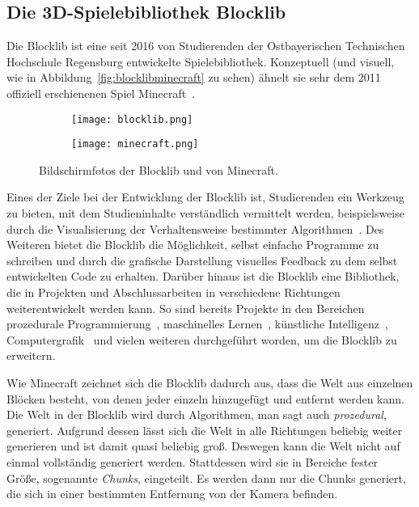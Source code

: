 \subsection{Die 3D-Spielebibliothek Blocklib}
Die Blocklib ist eine seit 2016 von Studierenden der Ostbayerischen Technischen Hochschule Regensburg entwickelte Spielebibliothek. Konzeptuell (und visuell, wie in Abbildung~\vref{fig:blocklibminecraft} zu sehen) ähnelt sie sehr dem 2011 offiziell erschienenen Spiel Minecraft~\cite{Mojang}.
\begin{figure}[!htbp]
	\begin{subfigure}[b]{.49\textwidth}
		\texttt{[image: blocklib.png]}
	\end{subfigure}
	\begin{subfigure}[b]{.49\textwidth}
		\texttt{[image: minecraft.png]}
	\end{subfigure}
	\caption{Bildschirmfotos der Blocklib und von Minecraft.}\label{fig:blocklibminecraft}
\end{figure}
Eines der Ziele bei der Entwicklung der Blocklib ist, Studierenden ein Werkzeug zu bieten, mit dem Studieninhalte verständlich vermittelt werden,  beispielsweise durch die Visualisierung der Verhaltensweise bestimmter Algorithmen~\cite{Helgert2018}. Des Weiteren bietet die Blocklib die Möglichkeit, selbst einfache Programme zu schreiben und durch die grafische Darstellung visuelles Feedback zu dem selbst entwickelten Code zu erhalten. Darüber hinaus ist die Blocklib eine Bibliothek, die in Projekten und Abschlussarbeiten in verschiedene Richtungen weiterentwickelt werden kann. So sind bereits Projekte in den Bereichen prozedurale Programmierung~\cite{Beer2017,Ebbinger2018a,Kalle2018,Sellner2020,Kohler2021}, maschinelles Lernen~\cite{Mayer2021}, künstliche Intelligenz~\cite{Amthor2017,Weidner2018,Bunke2021,Mayer2021}, Computergrafik~\cite{Zink2016,Ebbinger2018,Werner2018} und vielen weiteren durchgeführt worden, um die Blocklib zu erweitern.

Wie Minecraft zeichnet sich die Blocklib dadurch aus, dass die Welt aus einzelnen Blöcken besteht, von denen jeder einzeln hinzugefügt und entfernt werden kann. Die Welt in der Blocklib wird durch Algorithmen, man sagt auch \emph{prozedural}, generiert. Aufgrund dessen lässt sich die Welt in alle Richtungen beliebig weiter generieren und ist damit quasi beliebig groß. Deswegen kann die Welt nicht auf einmal vollständig generiert werden. Stattdessen wird sie in Bereiche fester Größe, sogenannte \emph{Chunks}, eingeteilt. Es werden dann nur die Chunks generiert, die sich in einer bestimmten Entfernung von der Kamera befinden.

